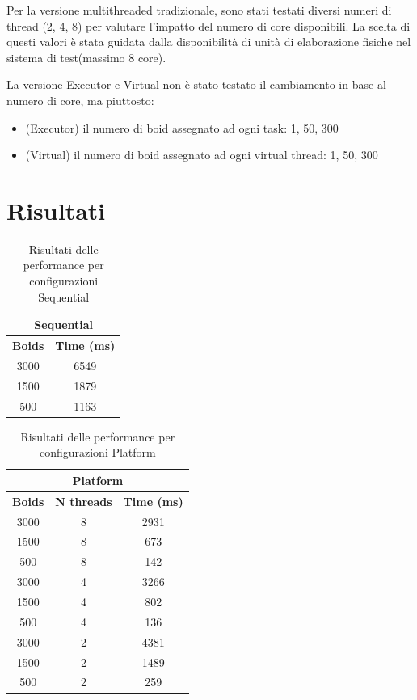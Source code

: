 \documentclass[a4paper,12pt]{report}
\begin{document}
Per la versione multithreaded tradizionale, sono stati testati diversi numeri di thread (2, 4, 8) per valutare l'impatto del numero di core disponibili. La scelta di questi valori è stata guidata dalla disponibilità di unità di elaborazione fisiche nel sistema di test(massimo 8 core).

La versione Executor e Virtual non è stato testato il cambiamento in base al numero di core, ma piuttosto:
\begin{itemize}
    \item (Executor) il numero di boid assegnato ad ogni task: 1, 50, 300
    \item (Virtual) il numero di boid assegnato ad ogni virtual thread: 1, 50, 300
\end{itemize}

\section{Risultati}

\begin{table}[h!]
    \centering
    \caption{Risultati delle performance per configurazioni Sequential}
    \begin{tabular}{|c|c|}
    \hline
    \multicolumn{2}{|c|}{\textbf{Sequential}} \\
    \hline
    \textbf{Boids}& \textbf{Time (ms)}\\
    \hline
    3000 & 6549 \\
    1500 & 1879  \\
    500  & 1163  \\
    \hline
    \end{tabular}
    \label{tab:sequential-performance}
\end{table}

\begin{table}[h!]
    \centering
    \caption{Risultati delle performance per configurazioni Platform}
    \begin{tabular}{|c|c|c|}
    \hline
    \multicolumn{3}{|c|}{\textbf{Platform}} \\
    \hline
    \textbf{Boids} & \textbf{N threads} & \textbf{Time (ms)}\\
    \hline
    3000 & 8 & 2931 \\
    1500 & 8 & 673  \\
    500  & 8 & 142  \\
    \hline
    \hline
    3000 & 4 & 3266 \\
    1500 & 4 & 802  \\
    500  & 4 & 136  \\
    \hline
    \hline
    3000 & 2 & 4381 \\
    1500 & 2 & 1489  \\
    500  & 2 & 259  \\
    \hline
    \end{tabular}
    \label{tab:platform-performance}
\end{table}
\end{document}
